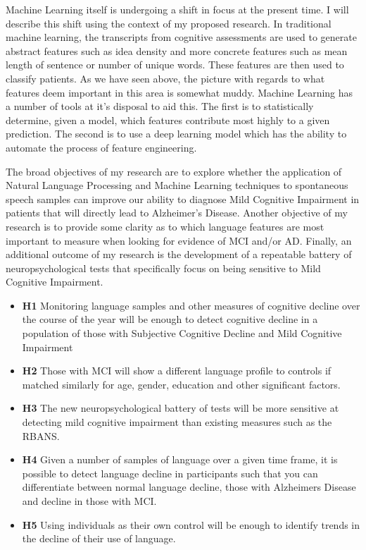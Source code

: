 \documentclass[10pt, letterpaper, twoside, openany]{book}
\begin{document}
\par
Machine Learning itself is undergoing a shift in focus at the present time. I will describe this shift using the context of my proposed research. In traditional machine learning, the transcripts from cognitive assessments are used to generate abstract features such as idea density and more concrete features such as mean length of sentence or number of unique words. These features are then used to classify patients. As we have seen above, the picture with regards to what features deem important in this area is somewhat muddy. Machine Learning has a number of tools at it's disposal to aid this. The first is to statistically determine, given a model, which features contribute most highly to a given prediction. The second is to use a deep learning model which has the ability to automate the process of feature engineering. 
\par 
The broad objectives of my research are to explore whether the application of Natural Language Processing and Machine Learning techniques to spontaneous speech samples can improve our ability to diagnose Mild Cognitive Impairment in patients that will directly lead to Alzheimer's Disease. Another objective of my research is to provide some clarity as to which language features are most important to measure when looking for evidence of MCI and/or AD. Finally, an additional outcome of my research is the development of a repeatable battery of neuropsychological tests that specifically focus on being sensitive to Mild Cognitive Impairment.
\begin{itemize}
	\item \textbf{H1} Monitoring language samples and other measures of cognitive decline over the course of the year will be enough to detect cognitive decline in a population of those with Subjective Cognitive Decline and Mild Cognitive Impairment
	\item \textbf{H2} Those with MCI will show a different language profile to controls if matched similarly for age, gender, education and other significant factors.
	\item \textbf{H3} The new neuropsychological battery of tests will be more sensitive at detecting mild cognitive impairment than existing measures such as the RBANS.
	\item \textbf{H4} Given a number of samples of language over a given time frame, it is possible to detect language decline in participants such that you can differentiate between normal language decline, those with Alzheimers Disease and decline in those with MCI.
	\item \textbf{H5} Using individuals as their own control will be enough to identify trends in the decline of their use of language.
\end{itemize}
\end{document}
